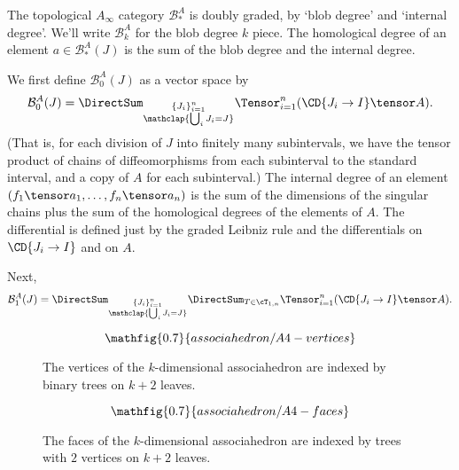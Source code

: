\documentclass[11pt,leqno]{amsart}
\def\bc{{\mathcal B}}
\begin{document}
\begin{defn}
The topological $A_\infty$ category $\bc_*^A$ is doubly graded, by `blob degree' and `internal degree'. We'll write $\bc_k^A$ for the blob degree $k$ piece.
The homological degree of an element $a \in \bc_*^A(J)$
is the sum of the blob degree and the internal degree.

We first define $\bc_0^A(J)$ as a vector space by
\begin{equation*}
\bc_0^A(J) = \DirectSum_{\substack{\{J_i\}_{i=1}^n \\ \mathclap{\bigcup_i J_i = J}}} \Tensor_{i=1}^n (\CD{J_i \to I} \tensor A).
\end{equation*}
(That is, for each division of $J$ into finitely many subintervals,
we have the tensor product of chains of diffeomorphisms from each subinterval to the standard interval,
and a copy of $A$ for each subinterval.)
The internal degree of an element $(f_1 \tensor a_1, \ldots, f_n \tensor a_n)$ is the sum of the dimensions of the singular chains
plus the sum of the homological degrees of the elements of $A$.
The differential is defined just by the graded Leibniz rule and the differentials on $\CD{J_i \to I}$ and on $A$.

Next,
\begin{equation*}
\bc_1^A(J) = \DirectSum_{\substack{\{J_i\}_{i=1}^n \\ \mathclap{\bigcup_i J_i = J}}} \DirectSum_{T \in \cT_{1,n}} \Tensor_{i=1}^n (\CD{J_i \to I} \tensor A).
\end{equation*}
\end{defn}

\begin{figure}[!ht]
\begin{equation*}
\mathfig{0.7}{associahedron/A4-vertices}
\end{equation*}
\caption{The vertices of the $k$-dimensional associahedron are indexed by binary trees on $k+2$ leaves.}
\label{fig:A4-vertices}
\end{figure}

\begin{figure}[!ht]
\begin{equation*}
\mathfig{0.7}{associahedron/A4-faces}
\end{equation*}
\caption{The faces of the $k$-dimensional associahedron are indexed by trees with $2$ vertices on $k+2$ leaves.}
\label{fig:A4-vertices}
\end{figure}

\newcommand{\tm}{\widetilde{m}}
\end{document}
